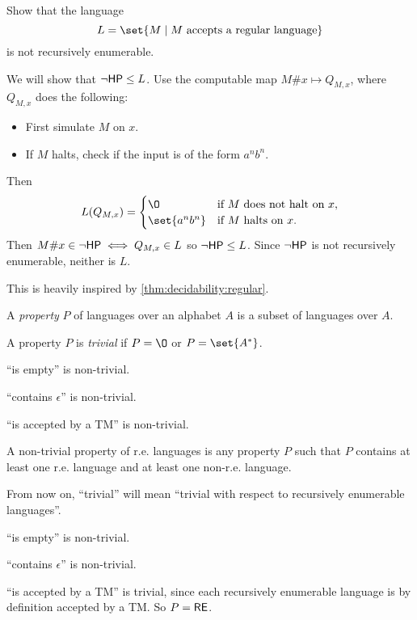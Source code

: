 \begin{exercise}
    Show that the language \[
        L = \set{M \mid M \text{ accepts a regular language}}
    \] is not recursively enumerable.
\end{exercise}
\begin{solution}
    We will show that $\neg\mathsf{HP} \le L$.
    Use the computable map $M\#x \mapsto Q_{M,x}$, where $Q_{M,x}$ does the
    following:
    \begin{itemize}
        \item First simulate $M$ on $x$.
        \item If $M$ halts, check if the input is of the form $a^n b^n$.
    \end{itemize}
    Then \[
        L(Q_{M,x}) = \begin{cases}
            \O & \text{if } M \text{ does not halt on } x, \\
            \set{a^n b^n} & \text{if } M \text{ halts on } x.
        \end{cases}
    \]
    Then $M\#x \in \neg\mathsf{HP} \iff Q_{M,x} \in L$ so $\neg\mathsf{HP} \le L$.
    Since $\neg\mathsf{HP}$ is not recursively enumerable, neither is $L$.

    This is heavily inspired by \cref{thm:decidability:regular}.
\end{solution}

\begin{definition}[Properties] \label{def:reductions:prop}
    A \emph{property} $P$ of languages over an alphabet $A$ is a subset
    of languages over $A$.

    A property $P$ is \emph{trivial} if $P = \O$ or $P = \set{A^*}$.
\end{definition}
\begin{examples}
    \item ``is empty'' is non-trivial.
    \item ``contains $\epsilon$'' is non-trivial.
    \item ``is accepted by a TM'' is non-trivial.
\end{examples}

A non-trivial property of r.e. languages is any property $P$ such that
$P$ contains at least one r.e. language and at least one non-r.e. language.

From now on, ``trivial'' will mean ``trivial with respect to recursively
enumerable languages''.
\begin{examples}
    \item ``is empty'' is non-trivial.
    \item ``contains $\epsilon$'' is non-trivial.
    \item ``is accepted by a TM'' is trivial, since each recursively
    enumerable language is by definition accepted by a TM.
    So $P = \mathsf{RE}$.
\end{examples}

